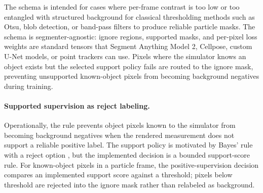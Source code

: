 The schema is intended for cases where per-frame contrast is too low or too entangled with structured background for classical thresholding methods such as Otsu, blob detection, or band-pass filters to produce reliable particle masks. The schema is segmenter-agnostic: ignore regions, supported masks, and per-pixel loss weights are standard tensors that Segment Anything Model 2, Cellpose, custom U-Net models, or point trackers can use. Pixels where the simulator knows an object exists but the selected support policy fails are routed to the ignore mask, preventing unsupported known-object pixels from becoming background negatives during training.

\paragraph{Supported supervision as reject labeling.}
Operationally, the rule prevents object pixels known to the simulator from becoming background negatives when the rendered measurement does not support a reliable positive label. The support policy is motivated by Bayes' rule with a reject option \cite{chow-reject}, but the implemented decision is a bounded support-score rule. For known-object pixels in a particle frame, the positive-supervision decision compares an implemented support score against a threshold; pixels below threshold are rejected into the ignore mask rather than relabeled as background.

